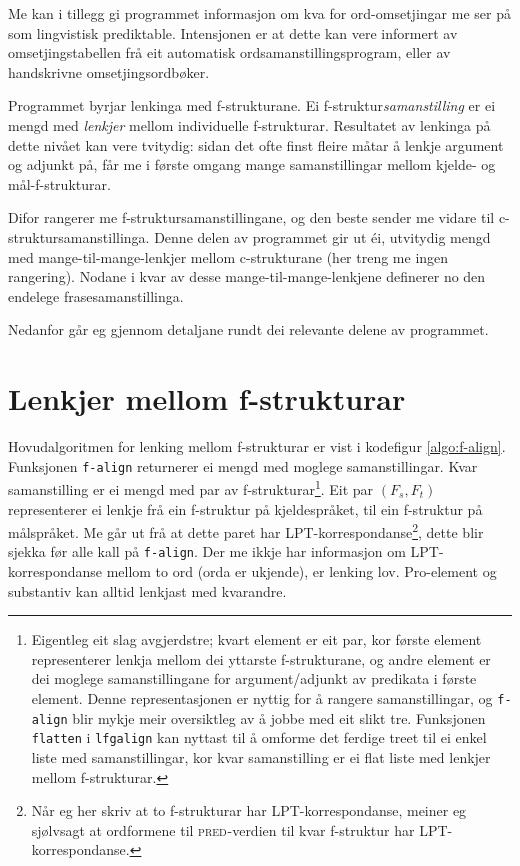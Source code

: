\documentclass[12pt,a4paper,oneside,draft]{report}
\newcommand{\F}[2]{\textsc{#1}\ensuremath{_{#2}}}
\newcommand{\PRED}{\F{pred}{}}
\begin{document}
Me kan i tillegg gi programmet informasjon om kva for ord-omsetjingar
me ser på som lingvistisk prediktable. Intensjonen er at dette kan
vere informert av omsetjingstabellen frå eit automatisk
ordsamanstillingsprogram, eller av handskrivne omsetjingsordbøker.

Programmet byrjar lenkinga med f\hyp{}strukturane. Ei
f\hyp{}struktur\emph{samanstilling} er ei mengd med \emph{lenkjer} mellom
individuelle f\hyp{}strukturar. Resultatet av lenkinga på dette nivået kan
vere tvitydig: sidan det ofte finst fleire måtar å lenkje argument og
adjunkt på, får me i første omgang mange samanstillingar mellom
kjelde- og mål-f\hyp{}strukturar.

Difor rangerer me f\hyp{}struktursamanstillingane, og den beste sender me
vidare til c\hyp{}struktursamanstillinga. Denne delen av programmet gir ut
éi, utvitydig mengd med mange-til-mange-lenkjer mellom c\hyp{}strukturane
(her treng me ingen rangering). Nodane i kvar av desse
mange-til-mange-lenkjene definerer no den endelege
frasesamanstillinga.

Nedanfor går eg gjennom detaljane rundt dei relevante delene av
programmet.

\section{Lenkjer mellom f\hyp{}strukturar}
\label{sec-4.1}

\label{SEC:impl-f-lenking}

Hovudalgoritmen for lenking mellom f\hyp{}strukturar er vist i kodefigur
\ref{algo:f-align}. Funksjonen \texttt{f-align} returnerer ei mengd med
moglege samanstillingar. Kvar samanstilling er ei mengd med par av
f\hyp{}strukturar\footnote{Eigentleg eit slag avgjerdstre; kvart element er eit par, kor
        første element representerer lenkja mellom dei yttarste
        f\hyp{}strukturane, og andre element er dei moglege
        samanstillingane for argument/adjunkt av predikata i første
        element. Denne representasjonen er nyttig for å rangere
        samanstillingar, og \texttt{f-align} blir mykje meir oversiktleg av å
        jobbe med eit slikt tre. Funksjonen \texttt{flatten} i \texttt{lfgalign} kan
        nyttast til å omforme det ferdige treet til ei enkel liste med
        samanstillingar, kor kvar samanstilling er ei flat liste med
        lenkjer mellom f\hyp{}strukturar. }. Eit par $(F_s,F_t)$ representerer ei lenkje frå
ein f\hyp{}struktur på kjeldespråket, til ein f\hyp{}struktur på målspråket. Me
går ut frå at dette paret har LPT\hyp{}korrespondanse\footnote{Når eg her skriv at to f\hyp{}strukturar har LPT\hyp{}korrespondanse,
        meiner eg sjølvsagt at ordformene til \PRED{}-verdien til kvar
        f\hyp{}struktur har LPT\hyp{}korrespondanse. }, dette blir
sjekka før alle kall på \texttt{f-align}. Der me ikkje har informasjon om
LPT\hyp{}korrespondanse mellom to ord (orda er ukjende), er lenking
lov. Pro-element og substantiv kan alltid lenkjast med kvarandre.
\end{document}
